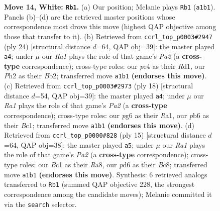 \documentclass[11pt]{article}
\begin{document}
\begin{figure}[p]
\caption{\textbf{Move 14, White: \texttt{Rb1}.} (a) Our position; Melanie plays \texttt{Rb1} (\texttt{a1b1}). Panels (b)--(d) are the retrieved master positions whose correspondence most drove this move (highest QAP objective among those that transfer to it). (b) Retrieved from \texttt{ccrl\_top\_p0003\#2947} (ply 24) [structural distance $d$=64, QAP obj=39]: the master played \texttt{a4}; under $\mu$ our \emph{Ra1} plays the role of that game's \emph{Pa2} (a \textbf{cross-type} correspondence); cross-type roles: our \emph{p}e4 as their \emph{R}d1, our \emph{P}h2 as their \emph{B}b2; transferred move \texttt{a1b1} \textbf{(endorses this move)}. (c) Retrieved from \texttt{ccrl\_top\_p0003\#2973} (ply 18) [structural distance $d$=54, QAP obj=39]: the master played \texttt{a4}; under $\mu$ our \emph{Ra1} plays the role of that game's \emph{Pa2} (a \textbf{cross-type} correspondence); cross-type roles: our \emph{p}g6 as their \emph{R}a1, our \emph{p}b6 as their \emph{B}c1; transferred move \texttt{a1b1} \textbf{(endorses this move)}. (d) Retrieved from \texttt{ccrl\_top\_p0000\#828} (ply 15) [structural distance $d$=64, QAP obj=38]: the master played \texttt{a5}; under $\mu$ our \emph{Ra1} plays the role of that game's \emph{Pa2} (a \textbf{cross-type} correspondence); cross-type roles: our \emph{B}c1 as their \emph{R}a8, our \emph{p}d6 as their \emph{B}c8; transferred move \texttt{a1b1} \textbf{(endorses this move)}. Synthesis: 6 retrieved analogs transferred to \texttt{Rb1} (summed QAP objective 228, the strongest correspondence among the candidate moves); Melanie committed it via the \texttt{search} selector.}
\label{fig:thought-m26}
\end{figure}

\clearpage
\end{document}
